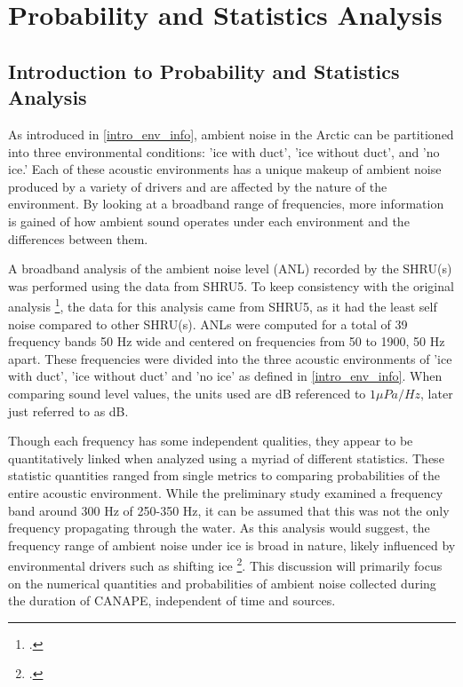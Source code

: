
\chapter{Probability and Statistics Analysis} \label{sec_probsnstat}


\section{Introduction to Probability and Statistics Analysis} \label{sec_statintro}


As introduced in \autoref{intro_env_info}, ambient noise in the Arctic can be partitioned into three environmental conditions: 'ice with duct', 'ice without duct', and 'no ice.' Each of these acoustic environments has a unique makeup of ambient noise produced by a variety of drivers and are affected by the nature of the environment. By looking at a broadband range of frequencies, more information is gained of how ambient sound operates under each environment and the differences between them.  

A broadband analysis of the ambient noise level (ANL) recorded by the SHRU(s) was performed using the data from SHRU5. To keep consistency with the original analysis \footcite[]{Bonnel2021}, the data for this analysis came from SHRU5, as it had the least self noise compared to other SHRU(s). ANLs were computed for a total of 39 frequency bands 50 Hz wide and centered on frequencies from 50 to 1900, 50 Hz apart. These frequencies were divided into the three acoustic environments of 'ice with duct', 'ice without duct' and 'no ice' as defined in \autoref{intro_env_info}. When comparing sound level values, the units used are dB referenced to $1 \mu Pa/Hz $, later just referred to as dB. %

Though each frequency has some independent qualities, they appear to be quantitatively linked when analyzed using a myriad of different statistics. These statistic quantities ranged from single metrics to comparing probabilities of the entire acoustic environment. While the preliminary study examined a frequency band around 300 Hz of 250-350 Hz, it can be assumed that this was not the only frequency propagating through the water. As this analysis would suggest, the frequency range of ambient noise under ice is broad in nature, likely influenced by environmental drivers such as shifting ice \footcite[]{ice_enviro}. This discussion will primarily focus on the numerical quantities and probabilities of ambient noise collected during the duration of CANAPE, independent of time and sources.



